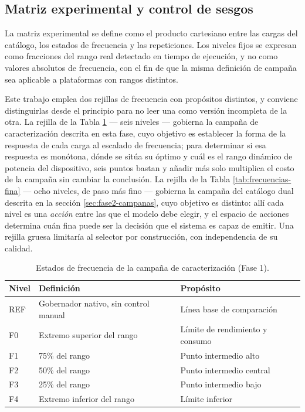 \documentclass[12pt,oneside,spanish]{book}
\begin{document}
\subsection{Matriz experimental y control de sesgos}

La matriz experimental se define como el producto cartesiano entre las cargas del catálogo, los estados de frecuencia y las repeticiones. Los niveles fijos se expresan como fracciones del rango real detectado en tiempo de ejecución, y no como valores absolutos de frecuencia, con el fin de que la misma definición de campaña sea aplicable a plataformas con rangos distintos.

Este trabajo emplea dos rejillas de frecuencia con propósitos distintos, y conviene distinguirlas desde el principio para no leer una como versión incompleta de la otra. La rejilla de la Tabla \ref{tab:frecuencias} --- seis niveles --- gobierna la campaña de caracterización descrita en esta fase, cuyo objetivo es establecer la forma de la respuesta de cada carga al escalado de frecuencia; para determinar si esa respuesta es monótona, dónde se sitúa su óptimo y cuál es el rango dinámico de potencia del dispositivo, seis puntos bastan y añadir más solo multiplica el costo de la campaña sin cambiar la conclusión. La rejilla de la Tabla \ref{tab:frecuencias-fina} --- ocho niveles, de paso más fino --- gobierna la campaña del catálogo dual descrita en la sección \ref{sec:fase2-campanas}, cuyo objetivo es distinto: allí cada nivel es una \textit{acción} entre las que el modelo debe elegir, y el espacio de acciones determina cuán fina puede ser la decisión que el sistema es capaz de emitir. Una rejilla gruesa limitaría al selector por construcción, con independencia de su calidad.

\begin{table}[H]
\centering
\caption[Estados de frecuencia (Fase 1)]{Estados de frecuencia de la campaña de caracterización (Fase 1).}
\label{tab:frecuencias}
\begin{tabular}{@{}lll@{}}
\toprule
\textbf{Nivel} & \textbf{Definición} & \textbf{Propósito} \\
\midrule
REF & Gobernador nativo, sin control manual & Línea base de comparación \\
F0 & Extremo superior del rango & Límite de rendimiento y consumo \\
F1 & 75\% del rango & Punto intermedio alto \\
F2 & 50\% del rango & Punto intermedio central \\
F3 & 25\% del rango & Punto intermedio bajo \\
F4 & Extremo inferior del rango & Límite inferior \\
\bottomrule
\end{tabular}
\end{table}
\end{document}
